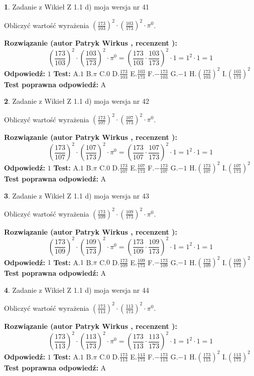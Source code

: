 \documentclass[12pt, a4paper]{article}
\theoremstyle{definition} %
\newtheorem{zad}{}
\newcommand{\zadStart}[1]{\begin{zad}#1\newline}
\newcommand{\zadStop}{\end{zad}}
\newcommand{\rozwStart}[2]{\noindent \textbf{Rozwiązanie (autor #1 , recenzent #2): }\newline}
\newcommand{\rozwStop}{\newline}
\newcommand{\odpStart}{\noindent \textbf{Odpowiedź:}\newline}
\newcommand{\odpStop}{\newline}
\newcommand{\testStart}{\noindent \textbf{Test:}\newline}
\newcommand{\testStop}{\newline}
\newcommand{\kluczStart}{\noindent \textbf{Test poprawna odpowiedź:}\newline}
\newcommand{\kluczStop}{\newline}
\begin{document}
\zadStart{Zadanie z Wikieł Z 1.1 d) moja wersja nr 41}

Obliczyć wartość wyrażenia $(\frac{173}{103})^{2} \cdot (\frac{103}{173})^{2} \cdot \pi^{0}$.
\zadStop
\rozwStart{Patryk Wirkus}{}
$$(\frac{173}{103})^{2} \cdot (\frac{103}{173})^{2} \cdot \pi^{0} = (\frac{173}{103} \cdot \frac{103}{173})^{2} \cdot 1 = 1^{2} \cdot 1 = 1$$
\rozwStop
\odpStart
$1$
\odpStop
\testStart
A.$1$ B.$\pi$ C.$0$ D.$\frac{173}{103}$ E.$\frac{103}{173}$
F.$-\frac{173}{103}$ G.$-1$
H.$(\frac{173}{103})^{2}$
I.$(\frac{103}{173})^{2}$
\testStop
\kluczStart
A
\kluczStop



\zadStart{Zadanie z Wikieł Z 1.1 d) moja wersja nr 42}

Obliczyć wartość wyrażenia $(\frac{173}{107})^{2} \cdot (\frac{107}{173})^{2} \cdot \pi^{0}$.
\zadStop
\rozwStart{Patryk Wirkus}{}
$$(\frac{173}{107})^{2} \cdot (\frac{107}{173})^{2} \cdot \pi^{0} = (\frac{173}{107} \cdot \frac{107}{173})^{2} \cdot 1 = 1^{2} \cdot 1 = 1$$
\rozwStop
\odpStart
$1$
\odpStop
\testStart
A.$1$ B.$\pi$ C.$0$ D.$\frac{173}{107}$ E.$\frac{107}{173}$
F.$-\frac{173}{107}$ G.$-1$
H.$(\frac{173}{107})^{2}$
I.$(\frac{107}{173})^{2}$
\testStop
\kluczStart
A
\kluczStop



\zadStart{Zadanie z Wikieł Z 1.1 d) moja wersja nr 43}

Obliczyć wartość wyrażenia $(\frac{173}{109})^{2} \cdot (\frac{109}{173})^{2} \cdot \pi^{0}$.
\zadStop
\rozwStart{Patryk Wirkus}{}
$$(\frac{173}{109})^{2} \cdot (\frac{109}{173})^{2} \cdot \pi^{0} = (\frac{173}{109} \cdot \frac{109}{173})^{2} \cdot 1 = 1^{2} \cdot 1 = 1$$
\rozwStop
\odpStart
$1$
\odpStop
\testStart
A.$1$ B.$\pi$ C.$0$ D.$\frac{173}{109}$ E.$\frac{109}{173}$
F.$-\frac{173}{109}$ G.$-1$
H.$(\frac{173}{109})^{2}$
I.$(\frac{109}{173})^{2}$
\testStop
\kluczStart
A
\kluczStop



\zadStart{Zadanie z Wikieł Z 1.1 d) moja wersja nr 44}

Obliczyć wartość wyrażenia $(\frac{173}{113})^{2} \cdot (\frac{113}{173})^{2} \cdot \pi^{0}$.
\zadStop
\rozwStart{Patryk Wirkus}{}
$$(\frac{173}{113})^{2} \cdot (\frac{113}{173})^{2} \cdot \pi^{0} = (\frac{173}{113} \cdot \frac{113}{173})^{2} \cdot 1 = 1^{2} \cdot 1 = 1$$
\rozwStop
\odpStart
$1$
\odpStop
\testStart
A.$1$ B.$\pi$ C.$0$ D.$\frac{173}{113}$ E.$\frac{113}{173}$
F.$-\frac{173}{113}$ G.$-1$
H.$(\frac{173}{113})^{2}$
I.$(\frac{113}{173})^{2}$
\testStop
\kluczStart
A
\kluczStop
\end{document}
